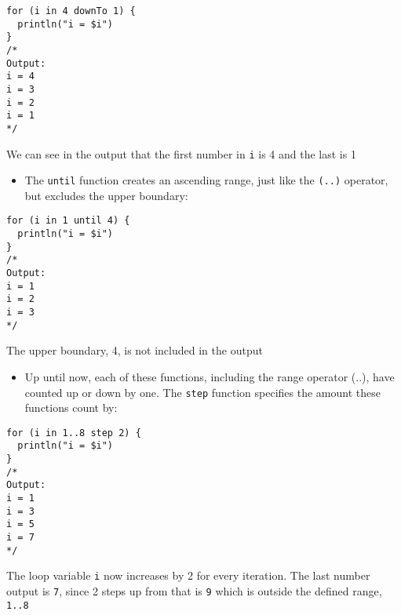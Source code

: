 \begin{verbatim}
for (i in 4 downTo 1) {
  println("i = $i")
}
/*
Output: 
i = 4
i = 3
i = 2
i = 1
*/
\end{verbatim}
We can see in the output that the first number in \verb!i! is 4 and the last is 1  

\begin{itemize}
    \item The \verb!until! function creates an ascending range, just like the 
    \verb!(..)! operator, but excludes the upper boundary:
\end{itemize}

\begin{verbatim}
for (i in 1 until 4) {
  println("i = $i")
}
/*
Output: 
i = 1
i = 2
i = 3
*/
\end{verbatim}
The upper boundary, 4, is not included in the output 

\begin{itemize}
    \item Up until now, each of these functions, including the range operator (..), have counted up or down by one. 
    The \verb!step! function specifies the amount these functions count by:
\end{itemize}

\begin{verbatim}
for (i in 1..8 step 2) {
  println("i = $i")
}
/*
Output: 
i = 1
i = 3
i = 5
i = 7
*/
\end{verbatim}

The loop variable \verb!i! now increases by 2 for every iteration. The last number output is \verb!7!, 
since 2 steps up from that is \verb!9! which is outside the defined range, \verb!1..8!